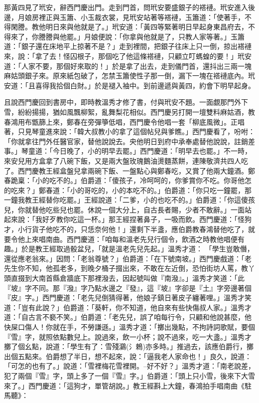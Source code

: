 那黃四見了玳安，辭西門慶出門。走到門首，問玳安要盛銀子的褡褳。玳安進入後邊，月娘房裡正與玉簫、小玉裁衣裳，見玳安站著等褡褳，玉簫道：「使著手，不得閑謄。教他明日來與他就是了。」玳安道：「黃四等緊著明日早起身東昌府去，不得來了，你謄謄與他罷。」月娘便說：「你拿與他就是了，只教人家等著。」玉簫道：「銀子還在床地平上掠著不是？」走到裡間，把銀子往床上只一倒，掠出褡褳來，說：「拿了去！怪囚根子，那個吃了他這條褡褳，只顧立叮螞蝗的要！」玳安道：「人家不要，那個好來取的！」於是拿了出去，走到儀門首，還抖出三兩一塊麻姑頭銀子來。原來紙包破了，怎禁玉簫使性子那一倒，漏下一塊在褡褳底內。玳安道：「且喜得我拾個白財。」於是褪入袖中。到前邊遞與黃四，約會下明早起身。

且說西門慶回到書房中，即時教溫秀才修了書，付與玳安不題。一面覷那門外下雪，紛紛揚揚，猶如風飄柳絮，亂舞梨花相似。西門慶另打開一壇雙料麻姑酒，教春鴻用布甑篩上來，鄭春在旁彈箏低唱，西門慶令他唱一套「柳底風微」。正唱著，只見琴童進來說：「韓大叔教小的拿了這個帖兒與爹瞧。」西門慶看了，吩咐： 「你就拿往門外任醫官家，替他說說去。央他明日到府中承奉處替他說說，註銷差事。」琴童道：「今日晚了，小的明早去罷。」西門慶道：「明早去也罷。」不一時，來安兒用方盒拿了八碗下飯，又是兩大盤玫瑰鵝油燙麵蒸餅，連陳敬濟共四人吃了。西門慶教王經盒盤兒拿兩碗下飯、一盤點心與鄭春吃，又賞了他兩大鐘酒。鄭春跪稟：「小的吃不的。」伯爵道：「傻孩子，冷呵呵的，你爹賞你不吃。你哥他怎的吃來？」鄭春道：「小的哥吃的，小的本吃不的。」伯爵道：「你只吃一鐘罷，那一鐘我教王經替你吃罷。」王經說道：「二爹，小的也吃不的。」伯爵道：「你這傻孩兒，你就替他吃些兒也罷。休說一個大分上，自古長者賜，少者不敢辭。」一面站起來說：「我好歹教你吃這一杯。」那王經捏著鼻子，一吸而飲。西門慶道：「怪狗才，小行貨子他吃不的，只恁奈何他！」還剩下半盞，應伯爵教春鴻替他吃了，就要令他上來唱南曲。西門慶道：「咱每和溫老先兒行個令，飲酒之時教他唱便有趣。」於是教王經取過骰盆兒，「就是溫老先兒先起。」溫秀才道： 「學生豈敢僭，還從應老翁來。」因問：「老翁尊號？」伯爵道：「在下號南坡。」西門慶戲道：「老先生你不知，他孤老多，到晚夕桶子掇出來，不敢在左近倒，恐怕街坊人罵，教丫頭直掇到大南首縣倉牆底下那裡潑去，因起號叫做『南潑』。」溫秀才笑道：「此『坡』字不同。那『潑』字乃點水邊之『發』，這『坡』字卻是『土』字旁邊著個『皮』字。」西門慶道：「老先兒倒猜得著，他娘子鎮日著皮子纏著哩。」溫秀才笑道：「豈有此說？」伯爵道：「葵軒，你不知道，他自來有些快傷叔人家。」溫秀才道：「自古言不褻不笑。」伯爵道：「老先兒，誤了咱每行令，只顧和他說甚麼，他快屎口傷人！你就在手，不勞謙遜。」溫秀才道：「擲出幾點，不拘詩詞歌賦，要個『雪』字，就照依點數兒上。說過來，飲一小杯；說不過來，吃一大盞。」溫秀才擲了個幺點，說道：「學生有了：雪殘鸂(氵鵣)亦多時。」推過去，該應伯爵行，擲出個五點來。伯爵想了半日，想不起來，說：「逼我老人家命也！」良久，說道：「可怎的也有了。」說道：「雪裡梅花雪裡開。--好不好？」溫秀才道：「南老說差，犯了兩個『雪』字，頭上多了一個『雪』字。」伯爵道：「頭上只小雪，後來下大雪來了。」西門慶道：「這狗才，單管胡說。」教王經斟上大鐘，春鴻拍手唱南曲《駐馬聽》：

